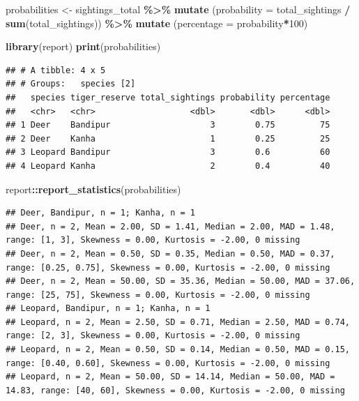 \documentclass[
]{book}
\newenvironment{Shaded}{\begin{snugshade}}{\end{snugshade}}
\newcommand{\AttributeTok}[1]{\textcolor[rgb]{0.13,0.29,0.53}{#1}}
\newcommand{\DecValTok}[1]{\textcolor[rgb]{0.00,0.00,0.81}{#1}}
\newcommand{\FunctionTok}[1]{\textcolor[rgb]{0.13,0.29,0.53}{\textbf{#1}}}
\newcommand{\NormalTok}[1]{#1}
\newcommand{\OtherTok}[1]{\textcolor[rgb]{0.56,0.35,0.01}{#1}}
\newcommand{\SpecialCharTok}[1]{\textcolor[rgb]{0.81,0.36,0.00}{\textbf{#1}}}
\begin{document}
\begin{Shaded}
\begin{Highlighting}[]
\NormalTok{probabilities }\OtherTok{\textless{}{-}}\NormalTok{ sightings\_total }\SpecialCharTok{\%\textgreater{}\%}
  \FunctionTok{mutate}\NormalTok{ (}\AttributeTok{probability =}\NormalTok{ total\_sightings }\SpecialCharTok{/} \FunctionTok{sum}\NormalTok{(total\_sightings)) }\SpecialCharTok{\%\textgreater{}\%} 
  \FunctionTok{mutate}\NormalTok{ (}\AttributeTok{percentage =}\NormalTok{ probability}\SpecialCharTok{*}\DecValTok{100}\NormalTok{)}
\end{Highlighting}
\end{Shaded}

\begin{Shaded}
\begin{Highlighting}[]
\FunctionTok{library}\NormalTok{(report)}
\FunctionTok{print}\NormalTok{(probabilities)}
\end{Highlighting}
\end{Shaded}

\begin{verbatim}
## # A tibble: 4 x 5
## # Groups:   species [2]
##   species tiger_reserve total_sightings probability percentage
##   <chr>   <chr>                   <dbl>       <dbl>      <dbl>
## 1 Deer    Bandipur                    3        0.75         75
## 2 Deer    Kanha                       1        0.25         25
## 3 Leopard Bandipur                    3        0.6          60
## 4 Leopard Kanha                       2        0.4          40
\end{verbatim}

\begin{Shaded}
\begin{Highlighting}[]
\NormalTok{report}\SpecialCharTok{::}\FunctionTok{report\_statistics}\NormalTok{(probabilities)}
\end{Highlighting}
\end{Shaded}

\begin{verbatim}
## Deer, Bandipur, n = 1; Kanha, n = 1
## Deer, n = 2, Mean = 2.00, SD = 1.41, Median = 2.00, MAD = 1.48, range: [1, 3], Skewness = 0.00, Kurtosis = -2.00, 0 missing
## Deer, n = 2, Mean = 0.50, SD = 0.35, Median = 0.50, MAD = 0.37, range: [0.25, 0.75], Skewness = 0.00, Kurtosis = -2.00, 0 missing
## Deer, n = 2, Mean = 50.00, SD = 35.36, Median = 50.00, MAD = 37.06, range: [25, 75], Skewness = 0.00, Kurtosis = -2.00, 0 missing
## Leopard, Bandipur, n = 1; Kanha, n = 1
## Leopard, n = 2, Mean = 2.50, SD = 0.71, Median = 2.50, MAD = 0.74, range: [2, 3], Skewness = 0.00, Kurtosis = -2.00, 0 missing
## Leopard, n = 2, Mean = 0.50, SD = 0.14, Median = 0.50, MAD = 0.15, range: [0.40, 0.60], Skewness = 0.00, Kurtosis = -2.00, 0 missing
## Leopard, n = 2, Mean = 50.00, SD = 14.14, Median = 50.00, MAD = 14.83, range: [40, 60], Skewness = 0.00, Kurtosis = -2.00, 0 missing
\end{verbatim}
\end{document}

